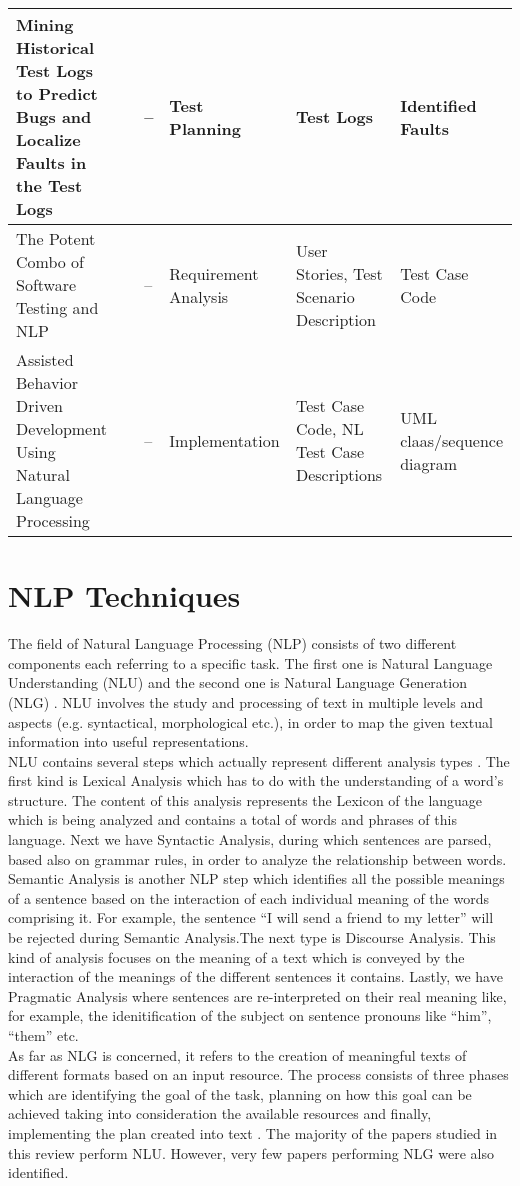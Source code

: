 \begin{longtable}{|p{3cm}|p{1cm}|p{2.5cm}|p{2.8cm}|p{2.5cm}|p{2.5cm}|}
            \hline Mining Historical Test Logs to Predict Bugs and Localize Faults in the Test Logs & \cite{8812113} & --& Test Planning & Test Logs & Identified Faults\\
            \hline The Potent Combo of Software Testing and NLP & \cite{mulla2020potent} & --& Requirement Analysis& User Stories, Test Scenario Description & Test Case Code\\
            \hline Assisted Behavior Driven Development Using Natural Language Processing & \cite{soeken2012assisted} & --& Implementation & Test Case Code, NL Test Case Descriptions & UML claas/sequence diagram\\
        \hline
\end{longtable}

\section{NLP Techniques}
The field of Natural Language Processing (NLP) consists of two different components each referring to a specific task. The first one is Natural Language Understanding (NLU) and the second one is Natural Language 
Generation (NLG) \cite{liddy2001natural, khurana2017natural}. NLU involves the study and processing of text in multiple levels and aspects (e.g. syntactical, morphological etc.), in order to map the given textual 
information into useful representations. \\
NLU contains several steps which actually represent different analysis types \cite{liddy2001natural}. The first kind is Lexical Analysis which has to do with the understanding of a word's structure. 
The content of this analysis represents the Lexicon of the language which is being analyzed and contains a total of words and phrases of this language. Next we have Syntactic Analysis, during which sentences are parsed, 
based also on grammar rules, in order to analyze the relationship between words. Semantic Analysis is another NLP 
step which identifies all the possible meanings of a sentence based on the interaction of each individual meaning of the words comprising it.  For example, the sentence ``I will send a friend to my letter'' will be rejected 
during Semantic Analysis.The next type is Discourse Analysis. This kind of analysis focuses on the meaning of a text which is conveyed by the interaction of the meanings of the different sentences it contains. Lastly, we have 
Pragmatic Analysis where sentences are re-interpreted on their real meaning like, for example, the idenitification of the subject on sentence pronouns like ``him'', ``them'' etc.\\ As far as NLG is concerned, 
it refers to the creation of meaningful texts of different formats based on an input resource. The process consists of three phases which are identifying the goal of the task, planning on how this goal can 
be achieved taking into consideration the available resources and finally, implementing the plan created into text \cite{khurana2017natural}. The majority of the papers studied in this review perform NLU. 
However, very few papers performing NLG were also identified.

